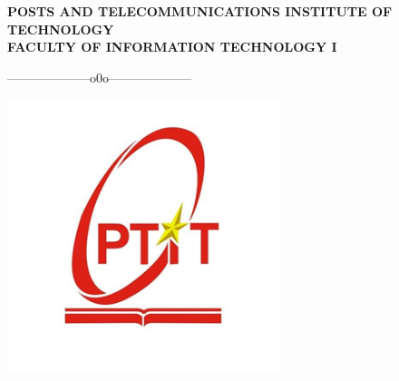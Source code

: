 \documentclass[12pt]{report}
\begin{document}
\clearpage
\begin{titlepage}
    \centering
    \textbf{\small POSTS AND TELECOMMUNICATIONS INSTITUTE OF TECHNOLOGY}\\ %
    \textbf{\normalsize FACULTY OF INFORMATION TECHNOLOGY I}\\ %
    \centerline{--------------------o0o--------------------}
    \vspace{1cm}
    \includegraphics[width=8cm]{logo.png}\\

\end{titlepage}
\end{document}
